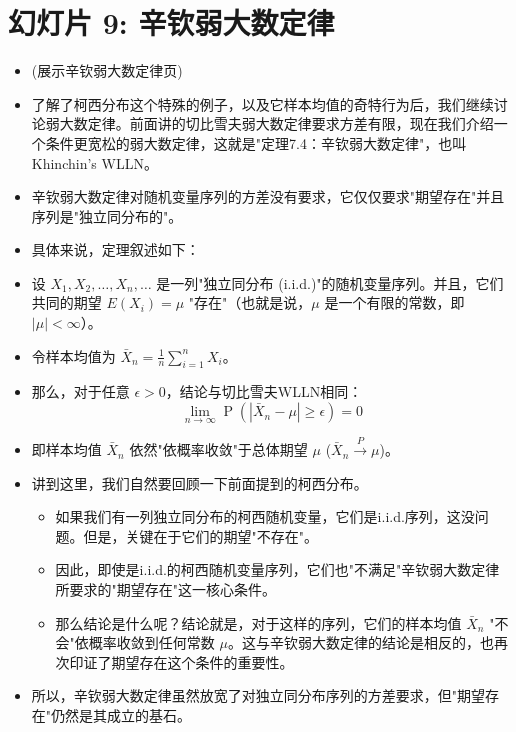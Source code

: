\documentclass[UTF8]{article} %
\DeclareMathOperator{\Prob}{\operatorname{P}}
\begin{document}
\section*{幻灯片 9: 辛钦弱大数定律}
\begin{itemize}
    \itemsep1em
    \item (展示辛钦弱大数定律页)
    \item 了解了柯西分布这个特殊的例子，以及它样本均值的奇特行为后，我们继续讨论弱大数定律。前面讲的切比雪夫弱大数定律要求方差有限，现在我们介绍一个条件更宽松的弱大数定律，这就是"定理7.4：辛钦弱大数定律"，也叫Khinchin's WLLN。
    \item 辛钦弱大数定律对随机变量序列的方差没有要求，它仅仅要求"期望存在"并且序列是"独立同分布的"。
    \item 具体来说，定理叙述如下：
    \item 设 $X_1, X_2, \dots, X_n, \dots$ 是一列"独立同分布 (i.i.d.)"的随机变量序列。并且，它们共同的期望 $E(X_i) = \mu$ "存在"（也就是说，$\mu$ 是一个有限的常数，即 $|\mu| < \infty$）。
    \item 令样本均值为 $\bar{X}_n = \frac{1}{n} \sum_{i=1}^{n} X_i$。
    \item 那么，对于任意 $\epsilon > 0$，结论与切比雪夫WLLN相同：
    \[ \lim_{n \to \infty} \Prob(|\bar{X}_n - \mu| \geq \epsilon) = 0 \]
    \item 即样本均值 $\bar{X}_n$ 依然"依概率收敛"于总体期望 $\mu$ ($\bar{X}_n \xrightarrow{P} \mu$)。
    \item 讲到这里，我们自然要回顾一下前面提到的柯西分布。
    \begin{itemize}[label=\textbullet, itemsep=0.3em]
        \item 如果我们有一列独立同分布的柯西随机变量，它们是i.i.d.序列，这没问题。但是，关键在于它们的期望"不存在"。
        \item 因此，即使是i.i.d.的柯西随机变量序列，它们也"不满足"辛钦弱大数定律所要求的"期望存在"这一核心条件。
        \item 那么结论是什么呢？结论就是，对于这样的序列，它们的样本均值 $\bar{X}_n$ "不会"依概率收敛到任何常数 $\mu$。这与辛钦弱大数定律的结论是相反的，也再次印证了期望存在这个条件的重要性。
    \end{itemize}
    \item 所以，辛钦弱大数定律虽然放宽了对独立同分布序列的方差要求，但"期望存在"仍然是其成立的基石。
\end{itemize}
\end{document}
